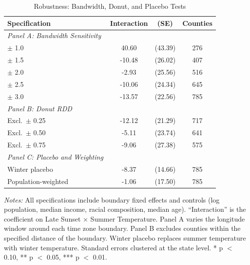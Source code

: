 \begin{table}[htbp]
\centering
\caption{Robustness: Bandwidth, Donut, and Placebo Tests}
\label{tab:robustness}
\small
\begin{tabular}{lccc}
\hline\hline
Specification & Interaction & (SE) & Counties \\
\hline
\textit{Panel A: Bandwidth Sensitivity} & & & \\
$\pm$ 1.0\textdegree{} & 40.60 & (43.39) & 276 \\
$\pm$ 1.5\textdegree{} & -10.48 & (26.02) & 407 \\
$\pm$ 2.0\textdegree{} & -2.93 & (25.56) & 516 \\
$\pm$ 2.5\textdegree{} & -10.06 & (24.34) & 645 \\
$\pm$ 3.0\textdegree{} & -13.57 & (22.56) & 785 \\
\hline
\textit{Panel B: Donut RDD} & & & \\
Excl.\ $\pm$ 0.25\textdegree{} & -12.12 & (21.29) & 717 \\
Excl.\ $\pm$ 0.50\textdegree{} & -5.11 & (23.74) & 641 \\
Excl.\ $\pm$ 0.75\textdegree{} & -9.06 & (27.38) & 575 \\
\hline
\textit{Panel C: Placebo and Weighting} & & & \\
Winter placebo & -8.37 & (14.66) & 785 \\
Population-weighted & -1.06 & (17.50) & 785 \\
\hline\hline
\end{tabular}
\begin{tablenotes}[flushleft]\small
\item \textit{Notes:} All specifications include boundary fixed effects and controls (log population, median income, racial composition, median age). ``Interaction'' is the coefficient on Late Sunset $\times$ Summer Temperature. Panel A varies the longitude window around each time zone boundary. Panel B excludes counties within the specified distance of the boundary. Winter placebo replaces summer temperature with winter temperature. Standard errors clustered at the state level. * p $<$ 0.10, ** p $<$ 0.05, *** p $<$ 0.01.
\end{tablenotes}
\end{table}

